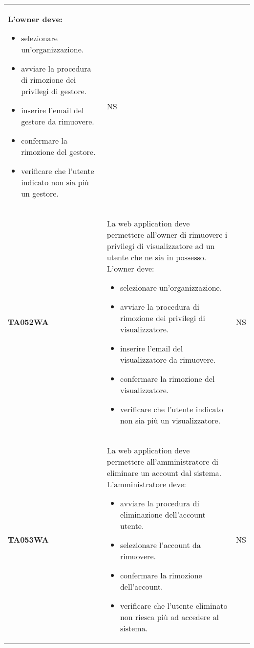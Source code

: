 \documentclass[../piano-di-qualifica.tex]{subfiles}
\begin{document}
\begin{longtable}[H]{>{\centering\bfseries}m{3cm} >{}m{10cm} >{\centering\arraybackslash}m{3cm}}
  L'owner deve:
  \begin{itemize}
    \item selezionare un'organizzazione.
    \item avviare la procedura di rimozione dei privilegi di gestore.
    \item inserire l'email del gestore da rimuovere.
    \item confermare la rimozione del gestore.
    \item verificare che l'utente indicato non sia più un gestore.
  \end{itemize}
                    & NS                                                                                                                                                                                                                                                               \\
  TA052WA           & La web application deve permettere all'owner di rimuovere i privilegi di visualizzatore ad un utente che ne sia in possesso. \newline
  L'owner deve:
  \begin{itemize}
    \item selezionare un'organizzazione.
    \item avviare la procedura di rimozione dei privilegi di visualizzatore.
    \item inserire l'email del visualizzatore da rimuovere.
    \item confermare la rimozione del visualizzatore.
    \item verificare che l'utente indicato non sia più un visualizzatore.
  \end{itemize}
                    & NS                                                                                                                                                                                                                                                               \\
  TA053WA           & La web application deve permettere all'amministratore di eliminare un account dal sistema. \newline
  L'amministratore deve:
  \begin{itemize}
    \item avviare la procedura di eliminazione dell'account utente.
    \item selezionare l'account da rimuovere.
    \item confermare la rimozione dell'account.
    \item verificare che l'utente eliminato non riesca più ad accedere al sistema.
  \end{itemize}
                    & NS                                                                                                                                                                                                                                                               \\


\end{longtable}
\end{document}

